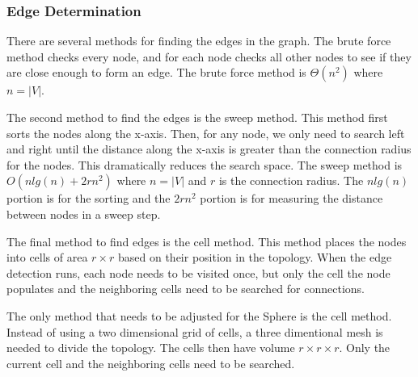 \documentclass{article}
\begin{document}
        \subsubsection{Edge Determination}
        There are several methods for finding the edges in the graph. The brute force method checks every node, and for each node checks all other nodes to see if they are close enough to form an edge. The brute force method is $\Theta\left(n^2\right)$ where $n = |V|$.
        \par
        The second method to find the edges is the sweep method. This method first sorts the nodes along the x-axis. Then, for any node, we only need to search left and right until the distance along the x-axis is greater than the connection radius for the nodes. This dramatically reduces the search space. The sweep method is $O\left(n lg(n) + 2rn^2\right)$ where $n = |V|$ and $r$ is the connection radius. The $n lg(n)$ portion is for the sorting and the $2rn^2$ portion is for measuring the distance between nodes in a sweep step.
        \par
        The final method to find edges is the cell method. This method places the nodes into cells of area $r \times r$ based on their position in the topology. When the edge detection runs, each node needs to be visited once, but only the cell the node populates and the neighboring cells need to be searched for connections.
        \par
        The only method that needs to be adjusted for the Sphere is the cell method. Instead of using a two dimensional grid of cells, a three dimentional mesh is needed to divide the topology. The cells then have volume $r \times r \times r$. Only the current cell and the neighboring cells need to be searched.
\end{document}
